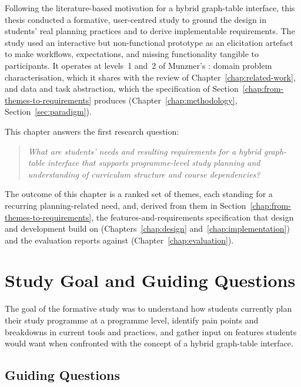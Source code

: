 \label{chap:formative-study}

Following the literature-based motivation for a hybrid graph-table interface, this thesis conducted a formative, user-centred study to ground the design in students' real planning practices and to derive implementable requirements. The study used an interactive but non-functional prototype as an elicitation artefact to make workflows, expectations, and missing functionality tangible to participants. It operates at levels~1 and~2 of Munzner's : domain problem characterisation, which it shares with the review of Chapter~\ref{chap:related-work}, and data and task abstraction, which the specification of Section~\ref{chap:from-themes-to-requirements} produces (Chapter~\ref{chap:methodology}, Section~\ref{sec:paradigm}).

This chapter answers the first research question:

\begin{quote}
\textit{What are students' needs and resulting requirements for a hybrid graph-table interface that supports programme-level study planning and understanding of curriculum structure and course dependencies?}
\end{quote}

The outcome of this chapter is a ranked set of themes, each standing for a recurring planning-related need, and, derived from them in Section~\ref{chap:from-themes-to-requirements}, the features-and-requirements specification that design and development build on (Chapters~\ref{chap:design} and~\ref{chap:implementation}) and the evaluation reports against (Chapter~\ref{chap:evaluation}).

\section{Study Goal and Guiding Questions}
\label{sec:study-goal}

The goal of the formative study was to understand how students currently plan their study programme at a programme level, identify pain points and breakdowns in current tools and practices, and gather input on features students would want when confronted with the concept of a hybrid graph-table interface.

\subsection{Guiding Questions}

